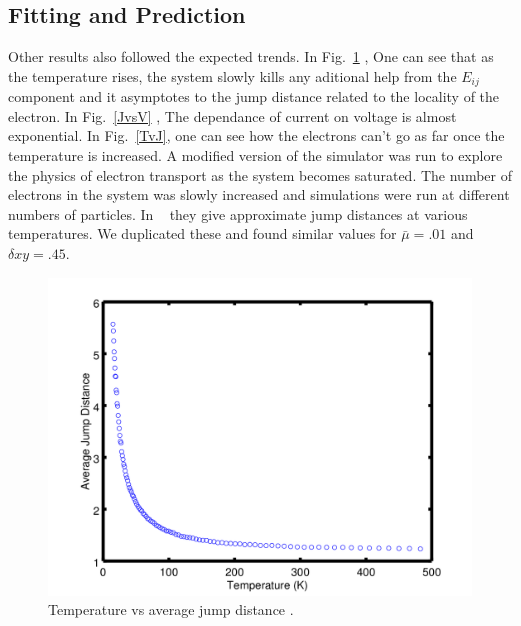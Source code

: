 \subsection{Fitting and Prediction}
  Other results also followed the expected trends. In Fig.~\ref{TvsRbar} , One can see that as the temperature rises, the system slowly kills any aditional help from the $E_{ij}$ component and it asymptotes to the jump distance related to the locality of the electron. In Fig.~\ref{JvsV} , The dependance of current on voltage is almost exponential. In Fig.~\ref{TvJ}, one can see how the electrons can't go as far once the temperature is increased. A modified version of the simulator was run to explore the physics of electron transport as the system becomes saturated. The number of electrons in the system was slowly increased and simulations were run at different numbers of particles. In ~\cite{Beloborodov07} they give approximate jump distances at various temperatures. We duplicated these and found similar values for $\bar \mu = .01$ and $\delta xy = .45$.

\begin{figure}[htbp]
\begin{center}
\includegraphics[scale=.50]{TvR.png}
\caption{Temperature vs average jump distance .}
\label{TvsRbar}
\end{center}
\end{figure}

